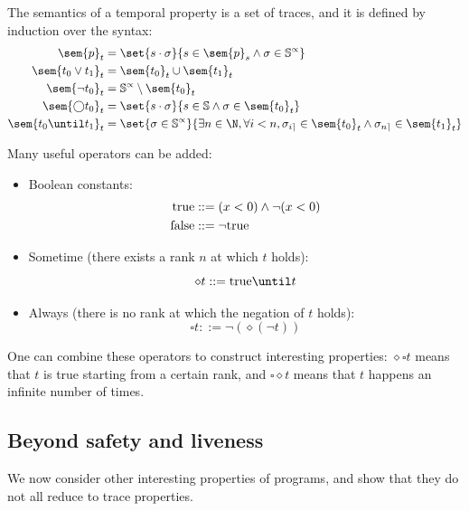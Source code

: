 \documentclass[toc, titlepaged]{../cs-classes/cs-classes}
\begin{document}
The semantics of a temporal property is a set of traces, and it is defined by induction over the syntax:
\begin{equation*}
    \begin{aligned}
        \sem{p}_t &= \set{s\cdot\sigma}{s\in\sem{p}_s\land\sigma\in\S^\propto}\\
        \sem{t_0\lor t_1}_t &= \sem{t_0}_t\cup\sem{t_1}_t\\
        \sem{\lnot t_0}_t &= \S^\propto \setminus \sem{t_0}_t\\
        \sem{\bigcirc t_0}_t &= \set{s\cdot\sigma}{s\in\S\land\sigma\in\sem{t_0}_t}\\
        \sem{t_0\until t_1}_t &= \set{\sigma\in\S^\propto}{\exists n\in\N, \forall i<n, \sigma_{i\rceil}\in\sem{t_0}_t \land \sigma_{n\rceil}\in\sem{t_1}_t}
    \end{aligned}
\end{equation*}

Many useful operators can be added:
\begin{itemize}
    \item Boolean constants:
    \begin{equation*}
        \begin{aligned}
            \textnormal{true} &::= (x<0) \land \lnot(x<0)\\
            \textnormal{false} &::= \lnot \textnormal{true}
        \end{aligned}
    \end{equation*}
    \item Sometime (there exists a rank $n$ at which $t$ holds):
    \begin{equation*}
        \diamond t ::= \textnormal{true} \until t
    \end{equation*}
    \item Always (there is no rank at which the negation of $t$ holds):
    \begin{equation*}
        \square t ::= \lnot(\diamond(\lnot t))
    \end{equation*}
\end{itemize}
One can combine these operators to construct interesting properties: $\diamond\square t$ means that $t$ is true starting from a certain rank, and $\square\diamond t$ means that $t$ happens an infinite number of times.

\subsection{Beyond safety and liveness}
We now consider other interesting properties of programs, and show that they do not all reduce to trace properties.
\end{document}
